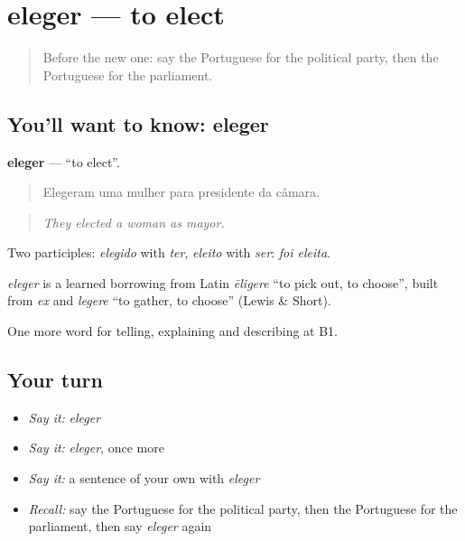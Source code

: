 \section[eleger]{eleger — to elect}

\label{lesson:PT-C380-eleger}



\begin{quote}
Before the new one: say the Portuguese for the political party, then the Portuguese for the parliament.
\end{quote}

\subsection*{You'll want to know: eleger}
\textbf{eleger} — \textquotedblleft{}to elect\textquotedblright{}.

\begin{quote}
Elegeram uma mulher para presidente da câmara.
\end{quote}

\begin{quote}
\emph{They elected a woman as mayor.}
\end{quote}

Two participles: \emph{elegido} with \emph{ter}, \emph{eleito} with \emph{ser}: \emph{foi eleita}.

\begin{cousinweb}
\emph{eleger} is a learned borrowing from Latin \emph{ēligere} \textquotedblleft{}to pick out, to choose\textquotedblright{}, built from \emph{ex} and \emph{legere} \textquotedblleft{}to gather, to choose\textquotedblright{} (Lewis \& Short).
\end{cousinweb}

\begin{grammarlens}[title={What you've built}]
One more word for telling, explaining and describing at B1.
\end{grammarlens}

\subsection*{Your turn}
\begin{itemize}
\raggedright
  \item \emph{Say it:} \emph{eleger}
  \item \emph{Say it:} \emph{eleger}, once more
  \item \emph{Say it:} a sentence of your own with \emph{eleger}
  \item \emph{Recall:} say the Portuguese for the political party, then the Portuguese for the parliament, then say \emph{eleger} again
\end{itemize}

